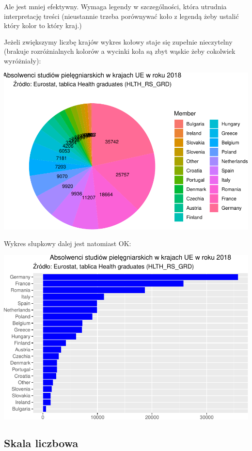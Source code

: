 \documentclass[
  openany]{book}
\begin{document}
Ale jest mniej efektywny. Wymaga legendy w szczególności, która utrudnia
interpretację treści (nieustannie trzeba porównywać koło z legendą żeby ustalić
który kolor to który kraj.)

Jeżeli zwiększymy liczbę krajów wykres kołowy staje się zupełnie nieczytelny
(brakuje rozróżnialnych kolorów a wycinki koła są zbyt wąskie żeby cokolwiek
wyróżniały):

\includegraphics{_main_files/figure-latex/unnamed-chunk-8-1.pdf}

Wykres słupkowy dalej jest natomiast OK:

\includegraphics{_main_files/figure-latex/unnamed-chunk-9-1.pdf}

\hypertarget{skala-liczbowa}{%
\subsection{Skala liczbowa}\label{skala-liczbowa}}
\end{document}

